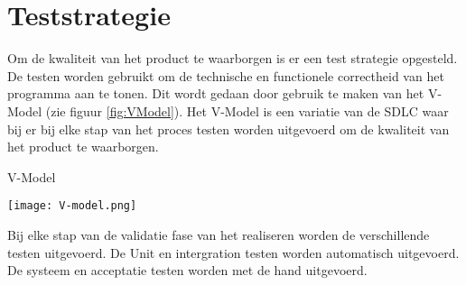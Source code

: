 \section{Teststrategie}
Om de kwaliteit van het product te waarborgen is er een test strategie opgesteld.
De testen worden gebruikt om de technische en functionele correctheid van het programma aan te tonen.
Dit wordt gedaan door gebruik te maken van het V-Model \parencite{VModel} (zie figuur \ref{fig:VModel}).
Het V-Model is een variatie van de SDLC waar bij er bij elke stap van het proces testen worden uitgevoerd om de kwaliteit van het product te waarborgen.

\whitespace
\begin{graphic}
    \captionsetup{type=figure}
    \caption{V-Model \parencite{VModel}}
    \texttt{[image: V-model.png]}
    \label{fig:VModel}
\end{graphic}

\whitespace
Bij elke stap van de validatie fase van het realiseren worden de verschillende testen uitgevoerd.
De Unit en intergration testen worden automatisch uitgevoerd.
De systeem en acceptatie testen worden met de hand uitgevoerd.

